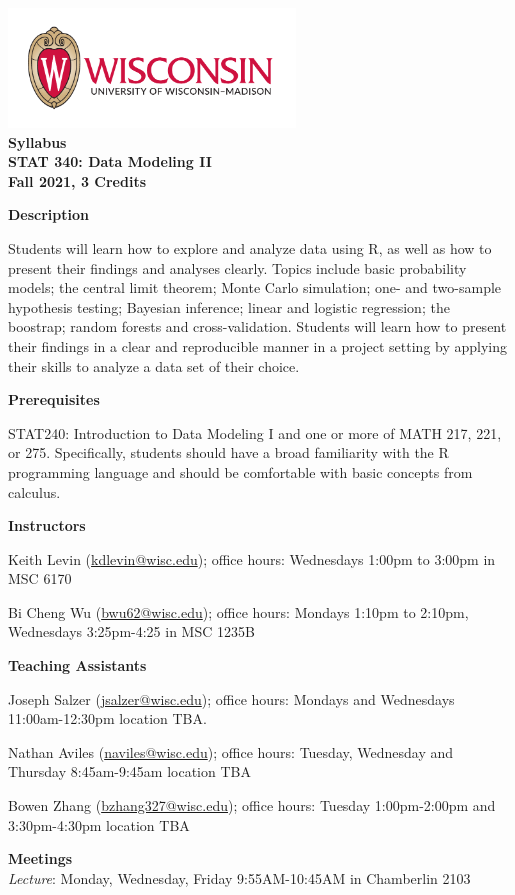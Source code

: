 \documentclass[11pt,oneside]{amsart}
\newcommand{\header}[1]{\bigbreak\textbf{#1}}
\begin{document}
\begin{center}
  \bf
  \includegraphics[width=3in]{color-flush-UWlogo-print} \\
  Syllabus \\
  STAT 340: Data Modeling II \\
  Fall 2021, 3 Credits 
\end{center}

\header{Description}

Students will learn how to explore and analyze data using R, as well as how to present their findings and analyses clearly.
Topics include basic probability models; the central limit theorem; Monte Carlo simulation; one- and two-sample hypothesis testing; Bayesian inference; linear and logistic regression; the boostrap; random forests and cross-validation.
Students will learn how to present their findings in a clear and reproducible manner in a project setting by applying their skills to analyze a data set of their choice.

\header{Prerequisites}

STAT240: Introduction to Data Modeling I
and one or more of MATH 217, 221, or 275.
Specifically, students should have a broad familiarity with the R programming language and should be comfortable with basic concepts from calculus.

\header{Instructors}

Keith Levin (\url{kdlevin@wisc.edu}); office hours: Wednesdays 1:00pm to 3:00pm in MSC 6170

Bi Cheng Wu (\url{bwu62@wisc.edu}); office hours: Mondays 1:10pm to 2:10pm, Wednesdays 3:25pm-4:25 in MSC 1235B

\header{Teaching Assistants}

Joseph Salzer (\url{jsalzer@wisc.edu}); office hours: Mondays and Wednesdays 11:00am-12:30pm location TBA.

Nathan Aviles (\url{naviles@wisc.edu}); office hours: Tuesday, Wednesday and Thursday 8:45am-9:45am location TBA

Bowen Zhang (\url{bzhang327@wisc.edu}); office hours: Tuesday 1:00pm-2:00pm and 3:30pm-4:30pm location TBA

\header{Meetings}\\
{\em Lecture}: Monday, Wednesday, Friday 9:55AM-10:45AM in Chamberlin 2103
\end{document}
